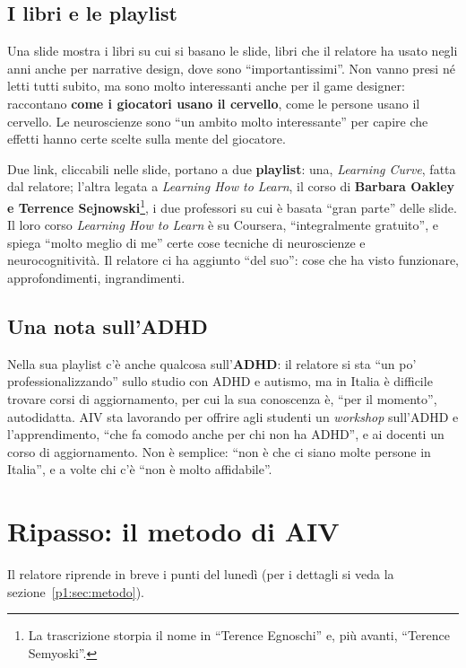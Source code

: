 \subsection{I libri e le playlist}

Una slide mostra i libri su cui si basano le slide, libri che il relatore
ha usato negli anni anche per narrative design, dove sono
``importantissimi''. Non vanno presi né letti tutti subito, ma sono molto
interessanti anche per il game designer: raccontano \textbf{come i
giocatori usano il cervello}, come le persone usano il cervello. Le
neuroscienze sono ``un ambito molto interessante'' per capire che effetti
hanno certe scelte sulla mente del giocatore.

Due link, cliccabili nelle slide, portano a due \textbf{playlist}: una,
\emph{Learning Curve}, fatta dal relatore; l'altra legata a \emph{Learning
How to Learn}, il corso di \textbf{Barbara Oakley e Terrence
Sejnowski}\footnote{La trascrizione storpia il nome in ``Terence
Egnoschi'' e, più avanti, ``Terence Semyoski''.}, i due professori su cui è
basata ``gran parte'' delle slide. Il loro corso \emph{Learning How to
Learn} è su Coursera, ``integralmente gratuito'', e spiega ``molto meglio di
me'' certe cose tecniche di neuroscienze e neurocognitività. Il relatore ci
ha aggiunto ``del suo'': cose che ha visto funzionare, approfondimenti,
ingrandimenti.

\subsection{Una nota sull'ADHD}

Nella sua playlist c'è anche qualcosa sull'\textbf{ADHD}: il relatore si sta
``un po' professionalizzando'' sullo studio con ADHD e autismo, ma in Italia
è difficile trovare corsi di aggiornamento, per cui la sua conoscenza è,
``per il momento'', autodidatta. AIV sta lavorando per offrire agli
studenti un \emph{workshop} sull'ADHD e l'apprendimento, ``che fa comodo
anche per chi non ha ADHD'', e ai docenti un corso di aggiornamento. Non è
semplice: ``non è che ci siano molte persone in Italia'', e a volte chi c'è
``non è molto affidabile''.

\section{Ripasso: il metodo di AIV}
\label{p0:sec:metodo}

Il relatore riprende in breve i punti del lunedì (per i dettagli si veda la
sezione~\ref{p1:sec:metodo}).

